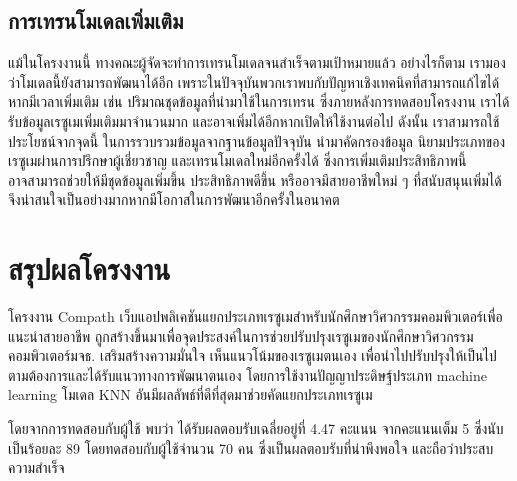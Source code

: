 \subsection{การเทรนโมเดลเพิ่มเติม}
\par{
    แม้ในโครงงานนี้ ทางคณะผู้จัดจะทำการเทรนโมเดลจนสำเร็จตามเป้าหมายแล้ว อย่างไรก็ตาม เรามองว่าโมเดลนี้ยังสามารถพัฒนาได้อีก เพราะในปัจจุบันพวกเราพบกับปัญหาเชิงเทคนิคที่สามารถแก้ไขได้หากมีเวลาเพิ่มเติม
    เช่น ปริมาณชุดข้อมูลที่นำมาใช้ในการเทรน ซึ่งภายหลังการทดสอบโครงงาน เราได้รับข้อมูลเรซูเมเพิ่มเติมมาจำนวนมาก และอาจเพิ่มได้อีกหากเปิดให้ใช้งานต่อไป
    ดังนั้น เราสามารถใช้ประโยชน์จากจุดนี้ ในการรวบรวมข้อมูลจากฐานข้อมูลปัจจุบัน นำมาคัดกรองข้อมูล นิยามประเภทของเรซูเมผ่านการปรึกษาผู้เชี่ยวชาญ 
    และเทรนโมเดลใหม่อีกครั้งได้ ซึ่งการเพิ่มเติมประสิทธิภาพนี้ อาจสามารถช่วยให้มีชุดข้อมูลเพิ่มขึ้น ประสิทธิภาพดีขึ้น หรืออาจมีสายอาชีพใหม่ ๆ ที่สนับสนุนเพิ่มได้
    จึงน่าสนใจเป็นอย่างมากหากมีโอกาสในการพัฒนาอีกครั้งในอนาคต
}

\section{สรุปผลโครงงาน}
\par{
    โครงงาน Compath เว็บแอปพลิเคชันแยกประเภทเรซูเมสำหรับนักศึกษาวิศวกรรมคอมพิวเตอร์เพื่อแนะนำสายอาชีพ
    ถูกสร้างขึ้นมาเพื่อจุดประสงค์ในการช่วยปรับปรุงเรซูเมของนักศึกษาวิศวกรรมคอมพิวเตอร์มจธ. เสริมสร้างความมั่นใจ เห็นแนวโน้มของเรซูเมตนเอง เพื่อนำไปปรับปรุงให้เป็นไปตามต้องการและได้รับแนวทางการพัฒนาตนเอง
    โดยการใช้งานปัญญาประดิษฐ์ประเภท machine learning โมเดล KNN อันมีผลลัพธ์ที่ดีที่สุดมาช่วยคัดแยกประเภทเรซูเม
    
    โดยจากการทดสอบกับผู้ใช้ พบว่า ได้รับผลตอบรับเฉลี่ยอยู่ที่ 4.47 คะแนน จากคะแนนเต็ม 5 ซึ่งนับเป็นร้อยละ 89 โดยทดสอบกับผู้ใช้จำนวน 70 คน ซึ่งเป็นผลตอบรับที่น่าพึงพอใจ และถือว่าประสบความสำเร็จ
}